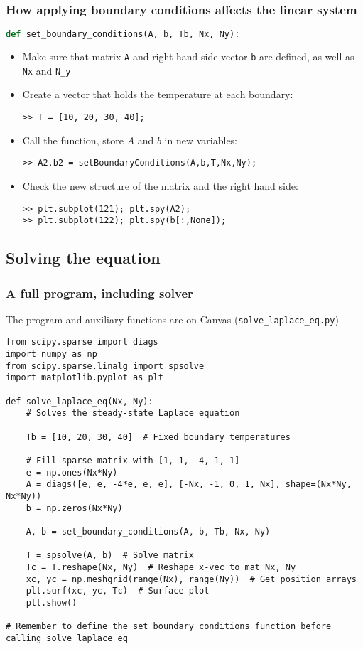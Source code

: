 \begin{frame}[fragile]
  \frametitle{How applying boundary conditions affects the linear system}
  \begin{lstlisting}[language=Python]
def set_boundary_conditions(A, b, Tb, Nx, Ny):
  \end{lstlisting}
  \pause
  \begin{itemize}
    \item Make sure that matrix \lstinline$A$ and right hand side vector \lstinline$b$ are defined, as well as \lstinline$Nx$ and \lstinline$N_y$
    \item Create a vector that holds the temperature at each boundary:
    \begin{lstlisting}
>> T = [10, 20, 30, 40];
    \end{lstlisting}
    \item Call the function, store $A$ and $b$ in new variables:
    \begin{lstlisting}
>> A2,b2 = setBoundaryConditions(A,b,T,Nx,Ny);
    \end{lstlisting}
    \item Check the new structure of the matrix and the right hand side:
    \begin{lstlisting}
>> plt.subplot(121); plt.spy(A2);
>> plt.subplot(122); plt.spy(b[:,None]);
    \end{lstlisting}
  \end{itemize}
\end{frame}

\subsection*{Solving the equation}
\begin{frame}[fragile]
  \frametitle{A full program, including solver}
  The program and auxiliary functions are on Canvas (\lstinline$solve_laplace_eq.py$)
  \begin{lstlisting}[linewidth=1.05\textwidth,basicstyle=\scriptsize]
from scipy.sparse import diags
import numpy as np
from scipy.sparse.linalg import spsolve
import matplotlib.pyplot as plt

def solve_laplace_eq(Nx, Ny):
    # Solves the steady-state Laplace equation
    
    Tb = [10, 20, 30, 40]  # Fixed boundary temperatures

    # Fill sparse matrix with [1, 1, -4, 1, 1]
    e = np.ones(Nx*Ny)
    A = diags([e, e, -4*e, e, e], [-Nx, -1, 0, 1, Nx], shape=(Nx*Ny, Nx*Ny))
    b = np.zeros(Nx*Ny)

    A, b = set_boundary_conditions(A, b, Tb, Nx, Ny)

    T = spsolve(A, b)  # Solve matrix
    Tc = T.reshape(Nx, Ny)  # Reshape x-vec to mat Nx, Ny
    xc, yc = np.meshgrid(range(Nx), range(Ny))  # Get position arrays
    plt.surf(xc, yc, Tc)  # Surface plot
    plt.show()
                                                                                      
# Remember to define the set_boundary_conditions function before calling solve_laplace_eq
  \end{lstlisting}
\end{frame}

